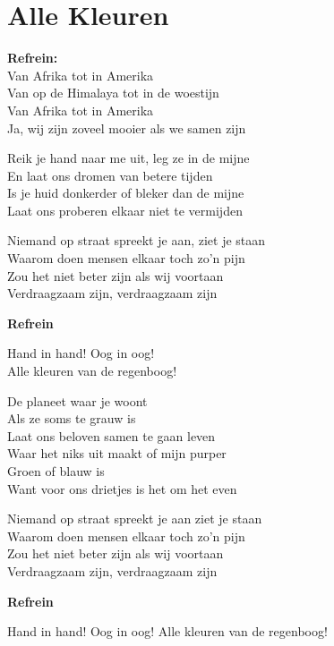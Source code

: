 \section{Alle Kleuren}
\textbf{Refrein:}\\
Van Afrika tot in Amerika\\
Van op de Himalaya tot in de woestijn\\
Van Afrika tot in Amerika\\
Ja, wij zijn zoveel mooier als we samen zijn

Reik je hand naar me uit, leg ze in de mijne\\
En laat ons dromen van betere tijden\\
Is je huid donkerder of bleker dan de mijne\\
Laat ons proberen elkaar niet te vermijden

Niemand op straat spreekt je aan, ziet je staan\\
Waarom doen mensen elkaar toch zo'n pijn\\
Zou het niet beter zijn als wij voortaan\\
Verdraagzaam zijn, verdraagzaam zijn

\textbf{Refrein}

Hand in hand! Oog in oog!\\
Alle kleuren van de regenboog!

De planeet waar je woont\\
Als ze soms te grauw is\\
Laat ons beloven samen te gaan leven\\
Waar het niks uit maakt of mijn purper\\
Groen of blauw is\\
Want voor ons drietjes is het om het even

Niemand op straat spreekt je aan ziet je staan\\
Waarom doen mensen elkaar toch zo'n pijn\\
Zou het niet beter zijn als wij voortaan\\
Verdraagzaam zijn, verdraagzaam zijn

\textbf{Refrein}

Hand in hand! Oog in oog!
Alle kleuren van de regenboog!
